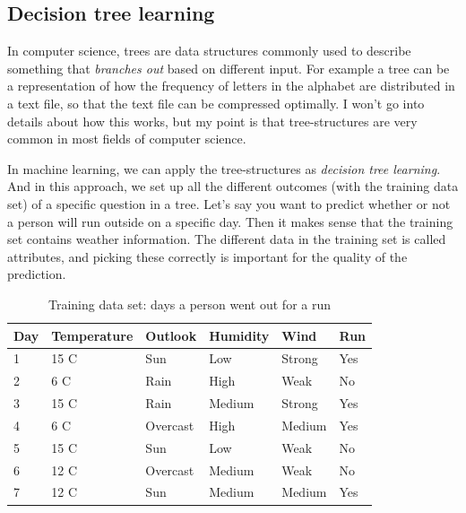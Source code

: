 \subsection{Decision tree learning}
In computer science, trees are data structures commonly used to describe something that \textit{branches out} based on different input. 
For example a tree can be a representation of how the frequency of letters in the alphabet are distributed in a text file, so that the text file 
can be compressed optimally. I won't go into details about how this works, but my point is that tree-structures are very common in most fields of 
computer science. 

In machine learning, we can apply the tree-structures as \textit{decision tree learning}. And in this approach, we set up all the different outcomes
(with the training data set) of a specific question in a tree. Let's say you want to predict whether or not a person will run outside on a specific day.
Then it makes sense that the training set contains weather information. The different data in the training set is called attributes, and picking these 
correctly is important for the quality of the prediction.

\begin{table}
    \begin{tabular}{| l | l | l | l | l | l |}
    \hline
    \textbf{Day} & \textbf{Temperature} & \textbf{Outlook}   & \textbf{Humidity}  & \textbf{Wind}     & \textbf{Run} \\ \hline
            1    & 15 C                 & Sun                & Low                & Strong            & Yes \\
            2    & 6 C                  & Rain               & High               & Weak              & No  \\
            3    & 15 C                 & Rain               & Medium             & Strong            & Yes \\
            4    & 6 C                  & Overcast           & High               & Medium            & Yes \\
            5    & 15 C                 & Sun                & Low                & Weak              & No  \\
            6    & 12 C                 & Overcast           & Medium             & Weak              & No  \\
            7    & 12 C                 & Sun                & Medium             & Medium            & Yes \\
    \hline
    \end{tabular}
    \caption{Training data set: days a person went out for a run}
    \label{table:days_running}
\end{table}

